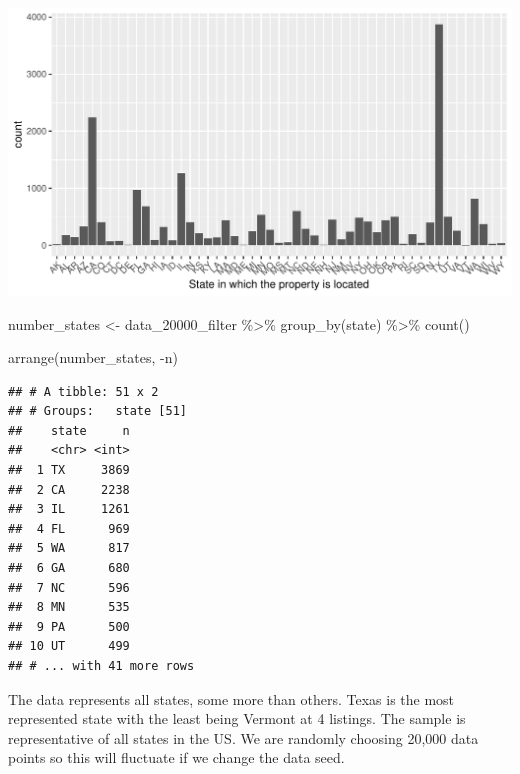 \documentclass[
]{article}
\newenvironment{Shaded}{\begin{snugshade}}{\end{snugshade}}
\newcommand{\FunctionTok}[1]{\textcolor[rgb]{0.00,0.00,0.00}{#1}}
\newcommand{\NormalTok}[1]{#1}
\newcommand{\OtherTok}[1]{\textcolor[rgb]{0.56,0.35,0.01}{#1}}
\newcommand{\SpecialCharTok}[1]{\textcolor[rgb]{0.00,0.00,0.00}{#1}}
\begin{document}
\begin{center}\includegraphics{final-project_files/figure-latex/unnamed-chunk-3-1} \end{center}

\begin{Shaded}
\begin{Highlighting}[]
\NormalTok{number\_states }\OtherTok{\textless{}{-}}\NormalTok{ data\_20000\_filter }\SpecialCharTok{\%\textgreater{}\%}
  \FunctionTok{group\_by}\NormalTok{(state) }\SpecialCharTok{\%\textgreater{}\%} \FunctionTok{count}\NormalTok{() }

\FunctionTok{arrange}\NormalTok{(number\_states, }\SpecialCharTok{{-}}\NormalTok{n)}
\end{Highlighting}
\end{Shaded}

\begin{verbatim}
## # A tibble: 51 x 2
## # Groups:   state [51]
##    state     n
##    <chr> <int>
##  1 TX     3869
##  2 CA     2238
##  3 IL     1261
##  4 FL      969
##  5 WA      817
##  6 GA      680
##  7 NC      596
##  8 MN      535
##  9 PA      500
## 10 UT      499
## # ... with 41 more rows
\end{verbatim}

The data represents all states, some more than others. Texas is the most
represented state with the least being Vermont at 4 listings. The sample
is representative of all states in the US. We are randomly choosing
20,000 data points so this will fluctuate if we change the data seed.
\end{document}
